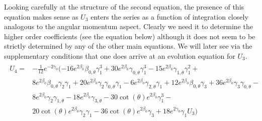 \documentclass[a4paper,11pt]{article}
\numberwithin{equation}{section}
\begin{document}
Looking carefully at the structure of the second equation, the presence of this equation makes sense as $U_3$ enters the series as a function of integration closely analogous to the angular momentum aspect. Clearly we need it to determine the higher order coefficients (see the equation below) although it does not seem to be strictly determined by any of the other main equations. We will later see via the supplementary conditions that one does arrive at an evolution equation for $U_3$.  
\begin{align}
\begin{split}
U_4=&-\frac{1}{12} e^{-2 \gamma _{0}} (-16 e^{2 \beta _{0}} \beta _{0, \theta} \gamma _{1}^3+ 30 e^{2 \beta _{0}} \gamma _{0, \theta} \gamma _{1}^3-15 e^{2 \beta _{0}} \gamma _{1, \theta} \gamma _{1}^2+ \\  
 &8 e^{2 \beta _{0}} \beta _{0, \theta} \gamma _{2} \gamma _{1}+20 e^{2 \beta _{0}} \gamma _{2} \gamma _{0, \theta} \gamma _{1}- 6 e^{2 \beta _{0}} \gamma _{2, \theta} \gamma _{1}+12 e^{2 \beta _{0}} \beta _{0, \theta} \gamma _{3}+ 36 e^{2 \beta _{0}} \gamma _{3} \gamma _{0, \theta}-\\
 & 8 e^{2 \beta _{0}} \gamma _{2} \gamma _{1, \theta}- 18 e^{2 \beta _{0}} \gamma _{3,\theta}-30 \cot (\theta ) e^{2 \beta _{0}} \gamma _{1}^3- \\
 & 20 \cot (\theta ) e^{2 \beta _{0}} \gamma _{2} \gamma _{1}-36 \cot (\theta ) e^{2 \beta _{0}} \gamma _{3}+18 e^{2 \gamma _{0}} \gamma _{1} U_{3}) 
\end{split}
\end{align}
\end{document}
